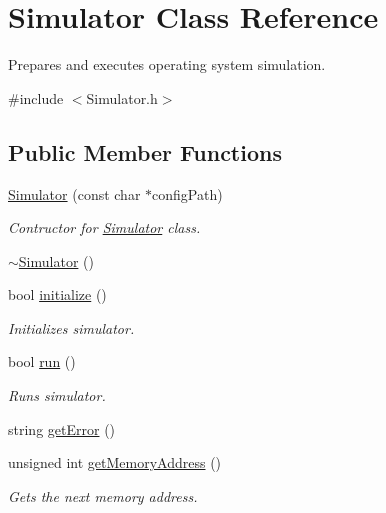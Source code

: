 \hypertarget{class_simulator}{}\section{Simulator Class Reference}
\label{class_simulator}


Prepares and executes operating system simulation.  




{\ttfamily \#include $<$Simulator.\+h$>$}

\subsection*{Public Member Functions}
\begin{DoxyCompactItemize}
\item 
\hyperlink{class_simulator_a5511e015f97c2695d3bfb5e003ab4d76}{Simulator} (const char $\ast$config\+Path)
\begin{DoxyCompactList}\small\item\em Contructor for \hyperlink{class_simulator}{Simulator} class. \end{DoxyCompactList}\item 
\hyperlink{class_simulator_a0f49aa04f42060a785adf77346b9de9f}{$\sim$\+Simulator} ()
\item 
bool \hyperlink{class_simulator_a7d7856e9c21592f0754b1825014674cc}{initialize} ()
\begin{DoxyCompactList}\small\item\em Initializes simulator. \end{DoxyCompactList}\item 
bool \hyperlink{class_simulator_afd158369264143934398ac97c61c9b9e}{run} ()
\begin{DoxyCompactList}\small\item\em Runs simulator. \end{DoxyCompactList}\item 
string \hyperlink{class_simulator_a18d712f028a9b09f131b48a0ca79c056}{get\+Error} ()
\item 
unsigned int \hyperlink{class_simulator_ab73a18e336c76ea75edb7750d933b867}{get\+Memory\+Address} ()
\begin{DoxyCompactList}\small\item\em Gets the next memory address. \end{DoxyCompactList}\end{DoxyCompactItemize}
